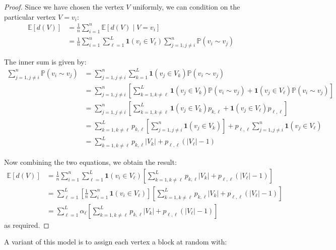 \documentclass{article}
\begin{document}
\begin{proof}
    Since we have chosen the vertex $V$ uniformly, we can condition on the particular vertex $V=v_i$:
    \begin{align*}
        \mathbb{E}[d(V)] &= \frac{1}{n} \sum_{i=1}^n \mathbb{E}[d(V)\mid V=v_i]\\
        &= \frac{1}{n} \sum_{i=1}^n \sum_{\ell=1}^L \mathbf{1}(v_i \in V_{\ell}) \sum_{j=1, j\neq i}^n \mathbb{P}(v_i \sim v_j)
    \end{align*}

    The inner sum is given by:
    \begin{align*}
        \sum_{j=1, j\neq i}^n \mathbb{P}(v_i \sim v_j) &= \sum_{j=1, j\neq i}^n \sum_{k=1}^L \mathbf{1}(v_j \in V_k) \mathbb{P}(v_i \sim v_j)\\
        &= \sum_{j=1, j\neq i}^n \left[\sum_{k=1, k\neq \ell}^L \mathbf{1}(v_j \in V_k) \mathbb{P}(v_i \sim v_j) + \mathbf{1}(v_j \in V_\ell) \mathbb{P}(v_i \sim v_j)\right]\\
        &= \sum_{j=1, j\neq i}^n \left[\sum_{k=1, k\neq \ell}^L \mathbf{1}(v_j \in V_k) p_{k,\ell} + \mathbf{1}(v_j \in V_\ell) p_{\ell, \ell}\right]\\
        &= \sum_{k=1, k\neq \ell}^L p_{k,\ell} \left[\sum_{j=1, j\neq i}^n \mathbf{1}(v_j \in V_k)\right]  +p_{\ell, \ell} \sum_{j=1, j\neq i}^n \mathbf{1}(v_j \in V_\ell) \\
        &= \sum_{k=1, k\neq \ell}^L p_{k,\ell} |V_k| + p_{\ell, \ell} (|V_\ell|-1)
    \end{align*}

    Now combining the two equations, we obtain the result:
    \begin{align*}
        \mathbb{E}[d(V)] &= \frac{1}{n} \sum_{i=1}^n \sum_{\ell=1}^L \mathbf{1}(v_i \in V_{\ell}) \left[\sum_{k=1, k\neq \ell}^L p_{k,\ell} |V_k| + p_{\ell, \ell} (|V_\ell|-1)\right]\\
        &= \sum_{\ell=1}^L \left[\frac{1}{n} \sum_{i=1}^{n} \mathbf{1}(v_i \in V_{\ell})\right] \left[\sum_{k=1, k\neq \ell}^L p_{k,\ell} |V_k| + p_{\ell, \ell} (|V_\ell|-1)\right]\\
        &= \sum_{\ell=1}^{L} \alpha_\ell \left[\sum_{k=1, k\neq \ell}^L p_{k,\ell} |V_k| + p_{\ell, \ell} (|V_\ell|-1)\right]
    \end{align*}
    as required.  
\end{proof}


A variant of this model is to assign each vertex a block at random with:    
\end{document}
